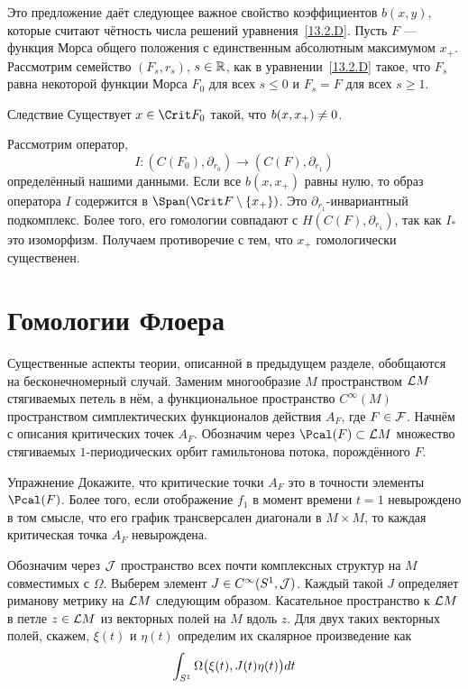 Это предложение даёт следующее важное свойство коэффициентов $b(x,
y)$, которые считают чётность числа решений
уравнения~\ref{13.2.D}. 
Пусть $F$ — функция Морса общего положения с единственным абсолютным
максимумом $x_{+}$.
Рассмотрим семейство $(F_{s},r_{s})$, $s\in\mathbb{R}$, как в
уравнении~\ref{13.2.D} такое, что $F_{s}$ равна некоторой функции
Морса $F_{0}$ для всех $s\le0$ и $F_{s} = F$ для всех $s\ge1$.


\begin{thm}{Следствие}\label{13.2.H}
  Существует $x\in\Crit F_{0}$ такой, что $b(x, x_{+})\z\neq0$.  
\end{thm}

Рассмотрим оператор,
\[
I:(C(F_{0}),\partial_{r_{0}})\to (C(F),\partial_{r_{1}})
\]
определённый нашими данными.
Если все $b(x,x_{+})$ равны нулю, то образ оператора $I$ содержится в
$\Span(\Crit F\setminus\{x_{+}\})$. 
Это $\partial_{r_{1}}$-ин\-ва\-ри\-ант\-ный подкомплекс.
Более того, его гомологии совпадают с $H(C(F),\partial_{r_{1}})$,
так как $I_{*}$ это изоморфизм.
Получаем противоречие с тем, что $x_{+}$ гомологически существенен.
\qeds

\section{Гомологии Флоера}\label{13.3}
Существенные аспекты теории, описанной в предыдущем разделе,
обобщаются на бесконечномерный случай.
Заменим многообразие $M$ пространством $\mathcal{L} M$ стягиваемых петель в нём, а функциональное
пространство $C^{\infty}(M)$ пространством симплектических
функционалов действия $A_{F}$, где $F\in\mathcal{F}$.
Начнём с описания критических точек $A_{F}$.
Обозначим через $\Pcal(F)\subset\L M$ множество стягиваемых
$1$-периодических орбит гамильтонова потока, порождённого $F$.

\begin{ex}{Упражнение}\label{13.3.A}
Докажите, что критические точки $A_{F}$ это в точности элементы $\Pcal(F)$.
Более того, если отображение $f_{1}$ в момент времени $t=1$ невырождено в том смысле, что его график трансверсален диагонали в $M\times M$, то каждая критическая точка $A_{F}$ невырождена.
\end{ex}

Обозначим через $\mathcal{J}$ пространство всех почти комплексных структур
на $M$ совместимых с $\Omega$.
Выберем элемент $J\in C^{\infty}(S^{1},\mathcal{J})$.
Каждый такой $J$ определяет риманову метрику на $\mathcal{L} M$ следующим образом.
Касательное пространство к $\mathcal{L} M$ в петле $z\in\mathcal{L} M$
 из векторных полей на $M$ вдоль $z$.
Для двух таких векторных полей, скажем, $\xi(t)$ и $\eta(t)$ определим
их скалярное произведение как 
\[
\int_{S^{1}}\Omega\big(\xi(t),J(t)\eta(t)\big)d t
\]

